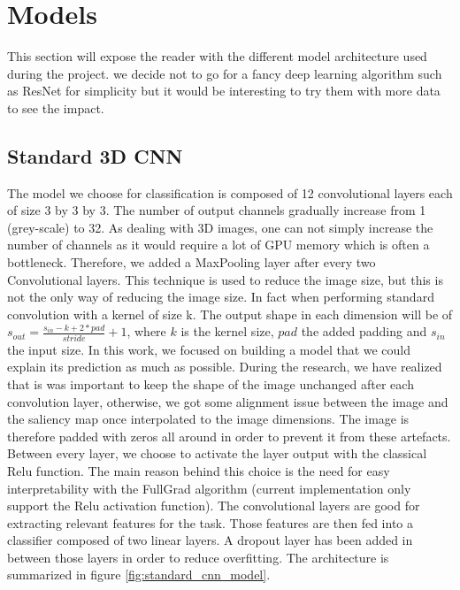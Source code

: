 \chapter{Models}
\label{chap:models}
This section will expose the reader with the different model architecture used during the project. we decide not to go for a fancy deep learning algorithm such as ResNet\cite{resNet_he2015deep} for simplicity but it would be interesting to try them with more data to see the impact.

\section{Standard 3D CNN}
\label{sec:standard_cnn}

The model we choose for classification is composed of 12 convolutional layers each of size 3 by 3 by 3. The number of output channels gradually increase from 1 (grey-scale) to 32. As dealing with 3D images, one can not simply increase the number of channels as it would require a lot of GPU memory which is often a bottleneck. Therefore, we added a MaxPooling layer after every two Convolutional layers. This technique is used to reduce the image size, but this is not the only way of reducing the image size. In fact when performing standard convolution with a kernel of size k. The output shape in each dimension will be of $s_{out} = \frac{s_{in} - k + 2* pad}{stride} + 1$, where $k$ is the kernel size, $pad$ the added padding and $s_{in}$ the input size. In this work, we focused on building a model that we could explain its prediction as much as possible. During the research, we have realized that is was important to keep the shape of the image unchanged after each convolution layer, otherwise, we got some alignment issue between the image and the saliency map once interpolated to the image dimensions. The image is therefore padded with zeros all around in order to prevent it from these artefacts. Between every layer, we choose to activate the layer output with the classical Relu\cite{relu_10.5555/3104322.3104425} function. The main reason behind this choice is the need for easy interpretability with the FullGrad algorithm (current implementation only support the Relu activation function).  
The convolutional layers are good for extracting relevant features for the task. Those features are then fed into a classifier composed of two linear layers. A dropout\cite{dropout_10.5555/2627435.2670313} layer has been added in between those layers in order to reduce overfitting. The architecture is summarized in figure \ref{fig:standard_cnn_model}.

